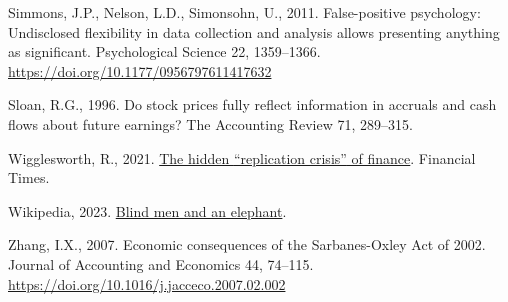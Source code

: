 \documentclass[
  letterpaper,
  DIV=11,
  numbers=noendperiod]{scrartcl}
\newlength{\cslhangindent}
\newlength{\cslentryspacingunit} %
\newenvironment{CSLReferences}[2] %
 {%
  \setlength{\parindent}{0pt}
  \ifodd #1
  \let\oldpar\par
  \def\par{\hangindent=\cslhangindent\oldpar}
  \fi
  \setlength{\parskip}{#2\cslentryspacingunit}
 }%
 {}
\begin{document}
\begin{CSLReferences}{1}{0}
\leavevmode{}%
Simmons, J.P., Nelson, L.D., Simonsohn, U., 2011. False-positive
psychology: Undisclosed flexibility in data collection and analysis
allows presenting anything as significant. Psychological Science 22,
1359--1366. \url{https://doi.org/10.1177/0956797611417632}

\leavevmode{}%
Sloan, R.G., 1996. Do stock prices fully reflect information in accruals
and cash flows about future earnings? The Accounting Review 71,
289--315.

\leavevmode{}%
Wigglesworth, R., 2021.
\href{https://www.ft.com/content/9025393f-76da-4b8f-9436-4341485c75d0?shareType=nongift}{The
hidden {``replication crisis''} of finance}. Financial Times.

\leavevmode{}%
Wikipedia, 2023.
\href{https://en.wikipedia.org/wiki/Blind_men_and_an_elephant}{Blind men
and an elephant}.

\leavevmode{}%
Zhang, I.X., 2007. Economic consequences of the {Sarbanes-Oxley Act} of
2002. Journal of Accounting and Economics 44, 74--115.
\url{https://doi.org/10.1016/j.jacceco.2007.02.002}

\end{CSLReferences}
\end{document}
